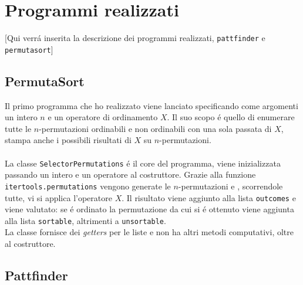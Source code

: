 \chapter{Programmi realizzati}
[Qui verr\'a inserita la descrizione dei programmi realizzati, \texttt{pattfinder} e \texttt{permutasort}]
\section*{PermutaSort}
Il primo programma che ho realizzato viene lanciato specificando come argomenti un intero $n$ e un operatore di ordinamento $X$. Il suo scopo \'e quello di enumerare tutte le $n$-permutazioni ordinabili e non ordinabili con una sola passata di $X$, stampa anche i possibili risultati di $X$ su $n$-permutazioni.\\\\
La classe \texttt{SelectorPermutations} \'e il core del programma, viene inizializzata passando un intero e un operatore al costruttore. Grazie alla funzione \texttt{itertools.permutations} vengono generate le $n$-permutazioni e , scorrendole tutte, vi si applica l'operatore $X$. Il risultato viene aggiunto alla lista \texttt{outcomes} e viene valutato: se \'e ordinato la permutazione da cui si \'e ottenuto viene aggiunta alla lista \texttt{sortable}, altrimenti a \texttt{unsortable}.\\La classe fornisce dei \textit{getters} per le liste e non ha altri metodi computativi, oltre al costruttore.
\section*{Pattfinder}